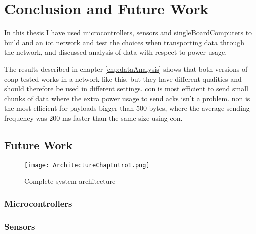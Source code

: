\chapter{Conclusion and Future Work}
\label{chp:results}



In this thesis I have used \glspl{microcontroller}, sensors and \glspl{singleBoardComputer} to build and an \gls{iot} network and test the choices when transporting data through the network, and discussed analysis of data with respect to power usage. 

The results described in chapter \ref{chp:dataAnalysis} shows that both versions of \gls{coap} tested works in a network like this, but they have different qualities and should therefore be used in different settings. \gls{con} is most efficient to send small chunks of data where the extra power usage to send \glspl{ack} isn't a problem. \gls{non} is the most efficient for payloads bigger than 500 bytes, where the average sending frequency was 200 ms faster than the same size using \gls{con}.  

\section{Future Work}

\begin{figure}[ht]
    \centering
    \texttt{[image: ArchitectureChapIntro1.png]}    
    \caption{Complete system architecture}
    \label{fig:systemArchitecture}
\end{figure}

\subsection{Microcontrollers}

\subsection{Sensors}

